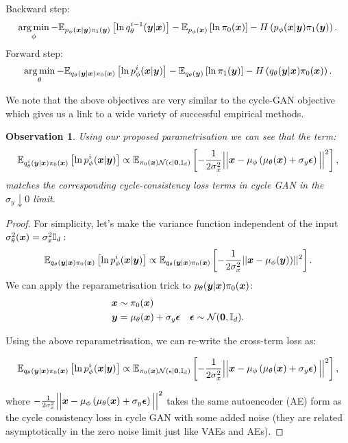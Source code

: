 \documentclass[a4paper,12pt,twoside,openright]{report}
\newtheorem{observation}{Observation}
\theoremstyle{definition}
\begin{document}
Backward step:
\begin{align*}
\operatorname*{arg\,min}_\phi- \mathbb{E}_{p_{\phi}({\bm{x}}|{\bm{y}})\pi_1({\bm{y}})}\left[  \operatorname{ln}  q^{i-1}_{\theta}({\bm{y}}|{\bm{x}})\right] -  \mathbb{E}_{p_{\phi}({\bm{x}})}\left[ \operatorname{ln}  \pi_0({\bm{x}}) \right] - H\left(p_{\phi}({\bm{x}}|{\bm{y}})\pi_1({\bm{y}})\right).
\end{align*}
Forward step:
\begin{align*}
\operatorname*{arg\,min}_\theta- \mathbb{E}_{q_{\theta}({\bm{y}}|{\bm{x}})\pi_0({\bm{x}})}\left[  \operatorname{ln}  p^i_{\phi}({\bm{x}}|{\bm{y}})\right] -  \mathbb{E}_{q_{\theta}({\bm{y}})}\left[ \operatorname{ln}  \pi_1({\bm{y}}) \right] - H\left(q_{\theta}({\bm{y}}|{\bm{x}})\pi_0({\bm{x}})\right).
\end{align*}

We note that the above objectives are very similar to the cycle-GAN \citep{zhu2017unpaired} objective which gives us a link to a wide variety of successful empirical methods.

\begin{observation}\label{obs:cycle}
Using our proposed parametrisation we can see that the term:
$$\mathbb{E}_{q^i_{\theta}({\bm{y}}|{\bm{x}})\pi_0({\bm{x}})}\left[  \operatorname{ln}  p^i_{\phi}({\bm{x}}|{\bm{y}})\right] \propto \mathbb{E}_{\pi_0({\bm{x}}){\mathcal{N}}(\epsilon|\textbf{0},{\mathbb{I}_d} )}\left[  -  \frac{1}{2\sigma_x^2}\Big|\Big|{\bm{x}}- \mu_\phi\left(\mu_\theta({\bm{x}}) + \sigma_y \bm{\epsilon}\right) \Big|\Big|^2\right],$$
matches the corresponding cycle-consistency loss terms in cycle GAN \cite{zhu2017unpaired} in the $\sigma_y \downarrow 0$ limit.
\end{observation}
\begin{proof}

For simplicity, let's make the variance function independent of the input $\sigma^2_{\theta}({\bm{x}}) = \sigma_{x}^2 {\mathbb{I}_d}:$ 
\begin{align*}
\mathbb{E}_{q_{\theta}({\bm{y}}|{\bm{x}})\pi_0({\bm{x}})}\left[  \operatorname{ln}  p^i_{\phi}({\bm{x}}|{\bm{y}})\right] \propto \mathbb{E}_{q_{\theta}({\bm{y}}|{\bm{x}})\pi_0({\bm{x}})}\left[  -  \frac{1}{2\sigma_x^2}||{\bm{x}}- {\mu}_{\phi}({\bm{y}}))||^2\right].
\end{align*}
We can apply the reparametrisation trick \cite{kingma2013auto} to $p_{\theta}({\bm{y}}|{\bm{x}})\pi_0({\bm{x}})$: 
\begin{align*}
    {\bm{x}} &\sim \pi_0({\bm{x}}) \\
    {\bm{y}} &= {\mu}_{\theta}({\bm{x}}) + \sigma_y \bm{\epsilon} \quad \bm{\epsilon} \sim {\mathcal{N}}(\textbf{0}, {\mathbb{I}_d}).
\end{align*}

Using the above reparametrisation, we can re-write the cross-term loss as: 

\begin{align*}
 \mathbb{E}_{q_{\theta}({\bm{y}}|{\bm{x}})\pi_0({\bm{x}})}\left[  \operatorname{ln}  p^i_{\phi}({\bm{x}}|{\bm{y}})\right] \propto \mathbb{E}_{\pi_0({\bm{x}}){\mathcal{N}}(\epsilon|\textbf{0},{\mathbb{I}_d} )}\left[  -  \frac{1}{2\sigma_x^2}\Big|\Big|{\bm{x}}- \mu_\phi\left(\mu_\theta({\bm{x}}) + \sigma_y \bm{\epsilon}\right) \Big|\Big|^2\right],
\end{align*}

where $ -  \frac{1}{2\sigma_x^2}\Big|\Big|{\bm{x}}- \mu_\phi\left(\mu_\theta({\bm{x}}) + \sigma_y \bm{\epsilon}\right) \Big|\Big|^2$ takes the same autoencoder (AE) form as the cycle consistency loss in cycle GAN with some added noise (they are related asymptotically in the zero noise limit just like VAEs and AEs).
\end{proof}
\end{document}
